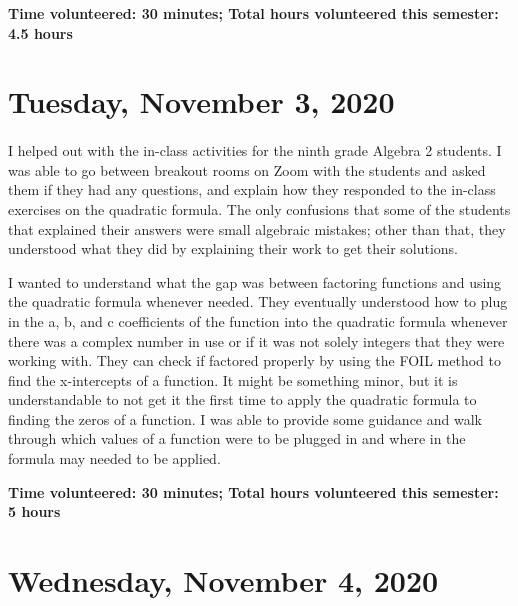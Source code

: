 \documentclass{article}
\begin{document}
\textbf{Time volunteered: 30 minutes; Total hours volunteered this semester: 4.5 hours}

\section{Tuesday, November 3, 2020}

\paragraph{}I helped out with the in-class activities for the ninth grade Algebra 2 students. I was able to go between breakout rooms on Zoom with the students and asked them if they had any questions, and explain how they responded to the in-class exercises on the quadratic formula. The only confusions that some of the students that explained their answers were small algebraic mistakes; other than that, they understood what they did by explaining their work to get their solutions. 

I wanted to understand what the gap was between factoring functions and using the quadratic formula whenever needed. They eventually understood how to plug in the a, b, and c coefficients of the function into the quadratic formula whenever there was a complex number in use or if it was not solely integers that they were working with. They can check if factored properly by using the FOIL method to find the x-intercepts of a function. It might be something minor, but it is understandable to not get it the first time to apply the quadratic formula to finding the zeros of a function. I was able to provide some guidance and walk through which values of a function were to be plugged in and where in the formula may needed to be applied.

\textbf{Time volunteered: 30 minutes; Total hours volunteered this semester: 5 hours}

\section{Wednesday, November 4, 2020}
\end{document}
